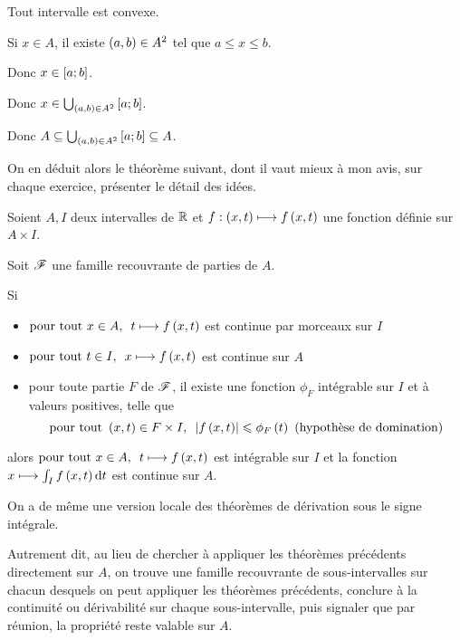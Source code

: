 \begin{dem}
Tout intervalle est convexe.

Si \(x\in A\), il existe \(\left(a,b\right)\in A^2\) tel que \(a\leq x\leq b\).

Donc \(x\in\left[a;b\right]\).

Donc \(x\in\bigcup_{\left(a,b\right)\in A^2}\left[a;b\right]\).

Donc \(A\subseteq\bigcup_{\left(a,b\right)\in A^2}\left[a;b\right]\subseteq A\).
\end{dem}

On en déduit alors le théorème suivant, dont il vaut mieux à mon avis, sur chaque exercice, présenter le détail des idées.

\begin{theo}
Soient \(A,I\) deux intervalles de \(\mathbb{R}\) et \(f:\left(x,t\right)\longmapsto f\left(x,t\right)\) une fonction définie sur \(A\times I\).

Soit \(\mathscr{F}\) une famille recouvrante de parties de \(A\).

Si

\begin{itemize}
    \item \(\quantifs{\tpt x\in A}t\mapsto f\paren{x,t}\) est continue par morceaux sur \(I\) \\
    \item \(\quantifs{\tpt t\in I}x\mapsto f\paren{x,t}\) est continue sur \(A\) \\
    \item pour toute partie \(F\) de \(\mathscr{F}\), il existe une fonction \(\phi_F\) intégrable sur \(I\) et à valeurs positives, telle que \[\quantifs{\tpt\paren{x,t}\in F\times I}\abs{f\paren{x,t}}\leq\phi_F\paren{t}\text{ (hypothèse de domination)}\]
\end{itemize}

alors \(\quantifs{\tpt x\in A}t\mapsto f\paren{x,t}\) est intégrable sur \(I\) et la fonction \(x\mapsto\int_If\paren{x,t}\odif{t}\) est continue sur \(A\).
\end{theo}

On a de même une version locale des théorèmes de dérivation sous le signe intégrale.

Autrement dit, au lieu de chercher à appliquer les théorèmes précédents directement sur \(A\), on trouve une famille recouvrante de sous-intervalles sur chacun desquels on peut appliquer les théorèmes précédents, conclure à la continuité ou dérivabilité sur chaque sous-intervalle, puis signaler que par réunion, la propriété reste valable sur \(A\).

